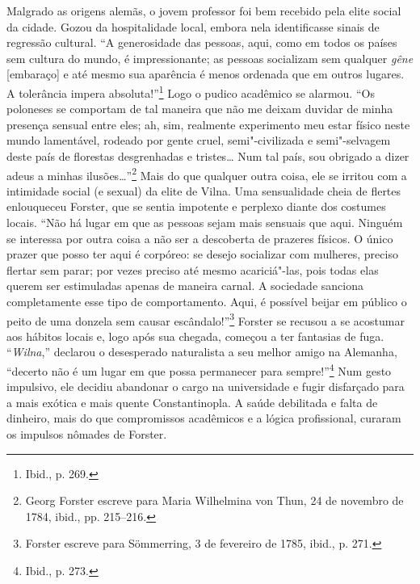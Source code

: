 Malgrado as origens alemãs, o jovem professor foi bem recebido pela
elite social da cidade. Gozou da hospitalidade local, embora nela
identificasse sinais de regressão cultural. ``A generosidade das
pessoas, aqui, como em todos os países sem cultura do mundo, é
impressionante; as pessoas socializam sem qualquer \textit{gêne}
{[}embaraço{]} e até mesmo sua aparência é menos ordenada que em outros
lugares. A tolerância impera absoluta!''\footnote{Ibid., p. 269.} Logo o
pudico acadêmico se alarmou. ``Os poloneses se comportam de tal maneira
que não me deixam duvidar de minha presença sensual entre eles; ah, sim,
realmente experimento meu estar físico neste mundo lamentável, rodeado
por gente cruel, semi"-civilizada e semi"-selvagem deste país de florestas
desgrenhadas e tristes\ldots{} Num tal país, sou obrigado a dizer adeus
a minhas ilusões\ldots{}''\footnote{Georg Forster escreve para Maria Wilhelmina von Thun, 24 de novembro de 1784, ibid., pp. 215--216.} Mais do que qualquer outra coisa, ele se irritou com a intimidade social (e
sexual) da elite de Vilna. Uma sensualidade cheia de flertes enlouqueceu
Forster, que se sentia impotente e perplexo diante dos costumes locais.
``Não há lugar em que as pessoas sejam mais sensuais que aqui. Ninguém
se interessa por outra coisa a não ser a descoberta de prazeres físicos.
O único prazer que posso ter aqui é corpóreo: se desejo socializar com
mulheres, preciso flertar sem parar; por vezes preciso até mesmo
acariciá"-las, pois todas elas querem ser estimuladas apenas de maneira
carnal. A sociedade sanciona completamente esse tipo de comportamento.
Aqui, é possível beijar em público o peito de uma donzela sem causar
escândalo!''\footnote{Forster escreve para Sömmerring, 3 de fevereiro de 1785, ibid., p. 271.} Forster se recusou a se acostumar aos hábitos locais e, logo após sua chegada, começou a ter fantasias de fuga.
``\textit{Wilna},'' declarou o desesperado naturalista a seu melhor amigo na
Alemanha, ``decerto não é um lugar em que possa permanecer para
sempre!''\footnote{Ibid., p. 273.} Num gesto impulsivo, ele decidiu
abandonar o cargo na universidade e fugir disfarçado para a mais exótica
e mais quente Constantinopla. A saúde debilitada e falta de dinheiro,
mais do que compromissos acadêmicos e a lógica profissional, curaram os
impulsos nômades de Forster.

